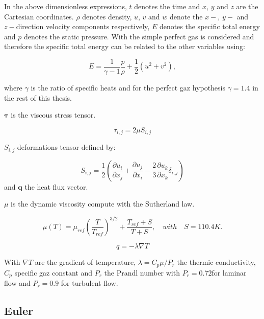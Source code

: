 In the above dimensionless expressions, $t$ denotes the time and $x$, $y$ and $z$ are the Cartesian coordinates.
$\rho$ denotes density, $u$, $v$ and $w$ denote the $x-$, $y-$ and $z-$direction velocity components respectively, $E$ denotes the specific total energy and $p$ denotes the static pressure.
With the simple perfect gas is considered and therefore the specific total energy can be related to the other variables using:

\begin{equation}
    E = \dfrac{1}{\gamma - 1} \dfrac{p}{\rho} + \dfrac{1}{2}\left( u^2 + v^2 \right),
    \label{eq:perfect_gas_energy}
\end{equation}

where $\gamma$ is the ratio of specific heats and for the perfect gaz hypothesis $\gamma = 1.4$ in the rest of this thesis.

$\mathbf{\tau}$ is the viscous stress tensor.

\begin{equation}
    \tau_{i,j} = 2\mu S_{i,j}
    \label{eq:stres_tensor}
\end{equation}

$S_{i,j}$ deformations tensor defined by:

\begin{equation}
    S_{i,j} = \frac{1}{2}\left(\frac{\partial u_i}{\partial x_j} + \frac{\partial u_j}{\partial x_i} - \frac{2}{3} \frac{\partial u_k}{\partial x_k}\delta_{i,j}\right)
    \label{eq:stres_tensor_deformation}
\end{equation}
and $\mathbf{q}$ the heat flux vector.

$\mu$ is the dynamic viscosity compute with the Sutherland law.

\begin{equation}
    \mu(T) = \mu_{ref}\left(\frac{T}{T_{ref}}\right)^{3/2} + \frac{T_{ref}+S}{T+S}, \quad with \quad S = 110.4 K.
    \label{eq:mu_sutherland}
\end{equation}

\begin{equation}
    q = -\lambda\nabla T
    \label{eq:stres_tensor}
\end{equation}

With $\nabla T$ are the gradient of temperature, $\lambda = C_p\mu/P_r$ the thermic conductivity, $C_p$ specific gaz constant and $P_r$ the Prandl number with $P_r = 0.72 $for laminar flow and $P_r = 0.9$ for turbulent flow.
\subsection {Euler}

